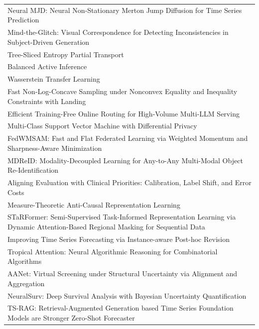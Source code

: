 \begin{table}[h]
{\begin{tabular}{l}
Neural MJD: Neural Non-Stationary Merton Jump Diffusion for Time Series Prediction \citep{gao2025neural}\\
Mind-the-Glitch: Visual Correspondence for Detecting Inconsistencies in Subject-Driven Generation \citep{eldesokey2025mindtheglitch}\\
Tree-Sliced Entropy Partial Transport \citep{tran2025treesliced}\\
Balanced Active Inference \citep{chen2025balanced}\\
Wasserstein Transfer Learning \citep{zhang2025wasserstein}\\
Fast Non-Log-Concave Sampling under Nonconvex Equality and Inequality Constraints with Landing \citep{jeon2025fast}\\
Efficient Training-Free Online Routing for High-Volume Multi-LLM Serving \citep{wu2025efficient}\\
Multi-Class Support Vector Machine with Differential Privacy \citep{park2025multiclass}\\
FedWMSAM: Fast and Flat Federated Learning via Weighted Momentum and Sharpness-Aware Minimization \citep{li2025fedwmsam}\\
MDReID: Modality-Decoupled Learning for Any-to-Any Multi-Modal Object Re-Identification \citep{feng2025mdreid}\\
Aligning Evaluation with Clinical Priorities: Calibration, Label Shift, and Error Costs \citep{flores2025aligning}\\
Measure-Theoretic Anti-Causal Representation Learning \citep{behnam2025measuretheoretic}\\
STaRFormer: Semi-Supervised Task-Informed Representation Learning via Dynamic Attention-Based Regional Masking for Sequential Data \citep{forstenhausler2025starformer}\\
Improving Time Series Forecasting via Instance-aware Post-hoc Revision \citep{liu2025improving}\\
Tropical Attention: Neural Algorithmic Reasoning for Combinatorial Algorithms \citep{hashemi2025tropical}\\
AANet: Virtual Screening under Structural Uncertainty via Alignment and Aggregation \citep{zhu2025aanet}\\
NeuralSurv: Deep Survival Analysis with Bayesian Uncertainty Quantification \citep{monod2025neuralsurv}\\
TS-RAG: Retrieval-Augmented Generation based Time Series Foundation Models are Stronger Zero-Shot Forecaster \citep{ning2025tsrag}\\

\end{tabular}}
\end{table}
